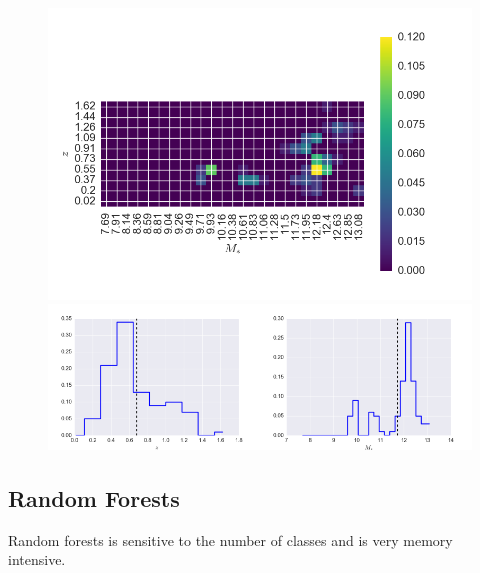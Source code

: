 \documentclass[12pt, preprint]{aastex}
\begin{document}
\begin{figure}
\includegraphics[width=1.\textwidth]{../fig/knn8.png}\\
\includegraphics[width=0.5\textwidth]{../fig/knn8z.png}\includegraphics[width=0.5\textwidth]{../fig/knn8m.png}
\caption{}
\label{fig:knn-good}
\end{figure}

\subsection{Random Forests}

Random forests is sensitive to the number of classes and is very memory intensive.
\end{document}
